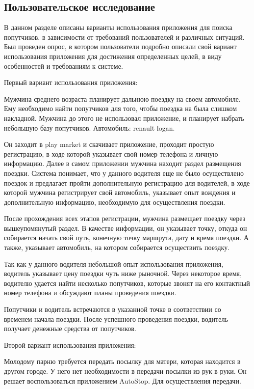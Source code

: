 \subsection{Пользовательское исследование}
В данном разделе описаны варианты использования приложения для поиска попутчиков, в зависимости от требований пользователей и различных ситуаций. Был проведен опрос, в котором пользователи подробно описали свой вариант использования приложения для достижения определенных целей, в виду особенностей и требованиям к системе.

Первый вариант использования приложения:

Мужчина среднего возраста планирует дальнюю поездку на своем автомобиле. Ему необходимо найти попутчиков для того, чтобы поездка на была слишком накладной. Мужчина до этого не использовал приложение, и планирует набрать небольшую базу попутчиков. Автомобиль: renault logan.

Он заходит в play market и скачивает приложение, проходит простую регистрацию, в ходе которой указывает свой номер телефона и личную информацию. Далее в самом приложении мужчина находит раздел размещения поездки. Система понимает, что у данного водителя еще не было осуществлено поездок и предлагает пройти дополнительную регистрацию для водителей, в ходе которой мужчина регистрирует свой автомобиль, указывает опыт вождения и дополнительную информацию, необходимую для осуществления поездки.

После прохождения всех этапов регистрации, мужчина размещает поездку через вышеупомянутый раздел. В качестве информации, он указывает точку, откуда он собирается начать свой путь, конечную точку маршрута, дату и время поездки. А также, указывает автомобиль, на котором собирается осуществить поездку.

Так как у данного водителя небольшой опыт использования приложения, водитель указывает цену поездки чуть ниже рыночной. Через некоторое время, водителю удается найти несколько попутчиков, которые звонят на его контактный номер телефона и обсуждают планы проведения поездки.

Попутчики и водитель встречаются в указанной точке в соответствии со временем начала поездки. После успешного проведения поездки, водитель получает денежные средства от попутчиков.

Второй вариант использования приложения:

Молодому парню требуется передать посылку для матери, которая находится в другом городе. У него нет необходимости в передачи посылки из рук в руки. Он решает воспользоваться приложением AutoStop. Для осуществления передачи.

